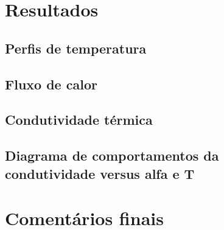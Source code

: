 \documentclass[8pt]{beamer}
\begin{document}
\section{Resultados}
\subsection{Perfis de temperatura}
\subsection{Fluxo de calor}
\subsection{Condutividade térmica}
\subsection{Diagrama de comportamentos da condutividade versus alfa e T}
\section{Comentários finais}
\end{document}
